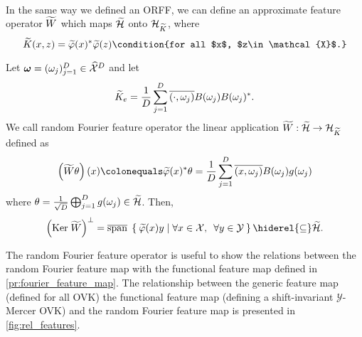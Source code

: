 \paragraph{}
In the same way we defined an \acs{ORFF}, we can define an approximate feature
operator $\widetilde{W}$ which maps $\widetilde{\mathcal{H}}$ onto
$\mathcal{H}_{\widetilde{K}}$, where 
\begin{dmath*}
    \tildeK{\omega}(x,z)=
    \tildePhi{\omega}(x)^\adjoint\tildePhi{\omega}(z)\condition{for
    all $x$, $z\in\mathcal{X}$.}
\end{dmath*}
\begin{definition}
    Let $\boldsymbol{\mathbf{\omega}}=(\omega_j)_{j=1}^D\in\widehat{\mathcal{X}}^D$ and let
    \begin{dmath*}
        \tildeK{\omega}_e=\frac{1}{D}\sum_{j=1}^D
        \conj{\pairing{\cdot,\omega_j}}B(\omega_j)B(\omega_j)^*.
    \end{dmath*}
    We call random Fourier feature operator the linear application
    $\widetilde{W}:\widetilde{\mathcal{H}}\to \mathcal{H}_{\widetilde{K}}$ defined
    as
    \begin{dmath*}
        \left(\tildeW{\omega} \theta\right)(x) 
        \colonequals \tildePhi{\omega}(x)^\adjoint \theta
        =\frac{1}{D}\sum_{j=1}^D
        \conj{\pairing{x,\omega_j}}B(\omega_j)g(\omega_j)
    \end{dmath*}
    where
    $\theta=\frac{1}{\sqrt{D}}\operatorname*{\bigoplus}_{j=1}^Dg(\omega_j)\in\widetilde{\mathcal{H}}$.
    Then,
    \begin{dmath*}
        \left(\Ker \tildeW{\omega}\right)^\perp 
        = \lspan\Set{\tildePhi{\omega}(x)y | \forall x\in\mathcal{X},\enskip
        \forall y\in\mathcal{Y}} \hiderel{\subseteq} \tildeH{\omega}.
    \end{dmath*}
\end{definition}
The random Fourier feature operator is useful to show the relations between the
random Fourier feature map with the functional feature map defined in
\cref{pr:fourier_feature_map}. The relationship between the generic feature map
(defined for all \acl{OVK}) the functional feature map (defining a
shift-invariant $\mathcal{Y}$-Mercer \acl{OVK}) and the random Fourier feature
map is presented in \cref{fig:rel_features}.
